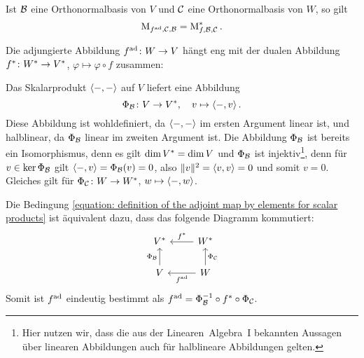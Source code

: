 \begin{lemma}
  Ist $\mathcal{B}$ eine Orthonormalbasis von $V$ und $\mathcal{C}$ eine Orthonormalbasis von $W$, so gilt
  \[
      \operatorname{M}_{f^{\operatorname{ad}}, \mathcal{C}, \mathcal{B}}
    = \operatorname{M}_{f, \mathcal{B}, \mathcal{C}} ^*.
  \]
\end{lemma}

Die adjungierte Abbildung $f^{\operatorname{ad}} \colon W \to V$ hängt eng mit der dualen Abbildung $f^* \colon W^* \to V^*$, $\varphi \mapsto \varphi \circ f$ zusammen:

Das Skalarprodukt $\left\langle -, - \right\rangle$ auf $V$ liefert eine Abbildung
\[
          \Phi_{\mathcal{B}}
  \colon  V
  \to     V^*,
  \quad   v
  \mapsto \left\langle -, v \right\rangle.
\]
Diese Abbildung ist wohldefiniert, da $\left\langle -, - \right\rangle$ im ersten Argument linear ist, und halblinear, da $\Phi_{\mathcal{B}}$ linear im zweiten Argument ist.
Die Abbildung $\Phi_{\mathcal{B}}$ ist bereits ein Isomorphismus, denn es gilt $\dim V^* = \dim V$ und $\Phi_{\mathcal{B}}$ ist injektiv\footnote{Hier nutzen wir, dass die aus der Linearen~Algebra~I bekannten Aussagen über linearen Abbildungen auch für halblineare Abbildungen gelten.}, denn für $v \in \ker \Phi_{\mathcal{B}}$ gilt $\left\langle -, v \right\rangle = \Phi_{\mathcal{B}}(v) = 0$, also $\|v\|^2 = \left\langle v, v \right\rangle = 0$ und somit $v = 0$.
Gleiches gilt für $\Phi_{\mathcal{C}} \colon W \to W^*$, $w \mapsto \left\langle -, w \right\rangle$.

Die Bedingung \eqref{equation: definition of the adjoint map by elements for scalar products} ist äquivalent dazu, dass das folgende Diagramm kommutiert:
\[
  \begin{tikzcd}
      V^*
    & W^*
      \arrow[swap]{l}{\dual{f}}
    \\
      V
      \arrow{u}{\Phi_{\basis{B}}}
    & W
      \arrow[swap]{u}{\Phi_{\basis{C}}}
      \arrow{l}{\adj{f}}
  \end{tikzcd}
\]
Somit ist $f^{\operatorname{ad}}$ eindeutig bestimmt als $f^{\operatorname{ad}} = \Phi_{\mathcal{B}}^{-1} \circ f^* \circ \Phi_{\mathcal{C}}$.

























